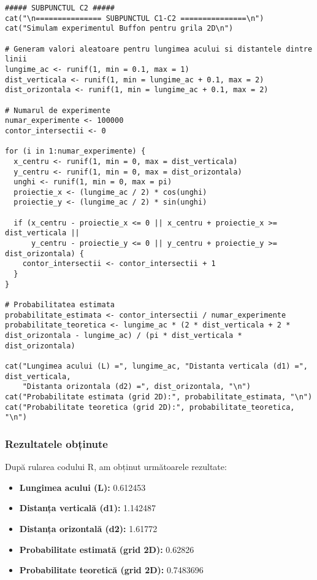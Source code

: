\documentclass{article}
\begin{document}
\begin{lstlisting}
##### SUBPUNCTUL C2 #####
cat("\n=============== SUBPUNCTUL C1-C2 ===============\n")
cat("Simulam experimentul Buffon pentru grila 2D\n")

# Generam valori aleatoare pentru lungimea acului si distantele dintre linii
lungime_ac <- runif(1, min = 0.1, max = 1)  
dist_verticala <- runif(1, min = lungime_ac + 0.1, max = 2)  
dist_orizontala <- runif(1, min = lungime_ac + 0.1, max = 2)  

# Numarul de experimente
numar_experimente <- 100000
contor_intersectii <- 0

for (i in 1:numar_experimente) {
  x_centru <- runif(1, min = 0, max = dist_verticala)
  y_centru <- runif(1, min = 0, max = dist_orizontala)
  unghi <- runif(1, min = 0, max = pi)
  proiectie_x <- (lungime_ac / 2) * cos(unghi)
  proiectie_y <- (lungime_ac / 2) * sin(unghi)
  
  if (x_centru - proiectie_x <= 0 || x_centru + proiectie_x >= dist_verticala ||
      y_centru - proiectie_y <= 0 || y_centru + proiectie_y >= dist_orizontala) {
    contor_intersectii <- contor_intersectii + 1
  }
}

# Probabilitatea estimata
probabilitate_estimata <- contor_intersectii / numar_experimente
probabilitate_teoretica <- lungime_ac * (2 * dist_verticala + 2 * dist_orizontala - lungime_ac) / (pi * dist_verticala * dist_orizontala)

cat("Lungimea acului (L) =", lungime_ac, "Distanta verticala (d1) =", dist_verticala, 
    "Distanta orizontala (d2) =", dist_orizontala, "\n")
cat("Probabilitate estimata (grid 2D):", probabilitate_estimata, "\n")
cat("Probabilitate teoretica (grid 2D):", probabilitate_teoretica, "\n")
\end{lstlisting}

\subsubsection*{Rezultatele obținute}

După rularea codului R, am obținut următoarele rezultate:

\begin{itemize}
    \item \textbf{Lungimea acului (L):} 0.612453
    \item \textbf{Distanța verticală (d1):} 1.142487
    \item \textbf{Distanța orizontală (d2):} 1.61772
    \item \textbf{Probabilitate estimată (grid 2D):} 0.62826
    \item \textbf{Probabilitate teoretică (grid 2D):} 0.7483696 
\end{itemize}
\end{document}
